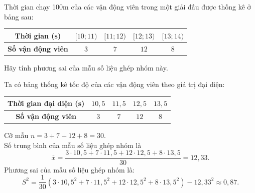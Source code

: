 \begin{bt}[Mức độ 2]%
Thời gian chạy 100m của các vận động viên trong một giải đấu được thống kê ở bảng sau:
\begin{center}
\begin{tabular}{|c|c|c|c|c|}
\hline
\textbf{Thời gian (s)} & $[10; 11)$ & $[11; 12)$ & $[12; 13)$ & $[13; 14)$ \\
\hline
\textbf{Số vận động viên} & $3$ & $7$ & $12$ & $8$ \\
\hline
\end{tabular}
\end{center}
Hãy tính phương sai của mẫu số liệu ghép nhóm này.
\loigiai
{
Ta có bảng thống kê tốc độ của các vận động viên theo giá trị đại diện:
\begin{center}
\begin{tabular}{|c|c|c|c|c|}
\hline
\textbf{Thời gian đại diện (s)} & $10{,}5$ & $11{,}5$ & $12{,}5$ & $13{,}5$ \\
\hline
\textbf{Số vận động viên} & $3$ & $7$ & $12$ & $8$ \\
\hline
\end{tabular}
\end{center}
Cỡ mẫu $n=3+7+12+8=30$.\\
Số trung bình của mẫu số liệu ghép nhóm là
\[ \overline{x}=\dfrac{3\cdot 10{,}5+7\cdot 11{,}5+12\cdot 12{,}5+8\cdot 13{,}5}{30}=12{,}33. \]
Phương sai của mẫu số liệu ghép nhóm là:
\[ S^2=\dfrac{1}{30}\left(3\cdot 10{,}5^2+7\cdot 11{,}5^2+12\cdot 12{,}5^2+8\cdot 13{,}5^2 \right)-12{,}33^2\approx 0{,}87. \]
}
\end{bt}

